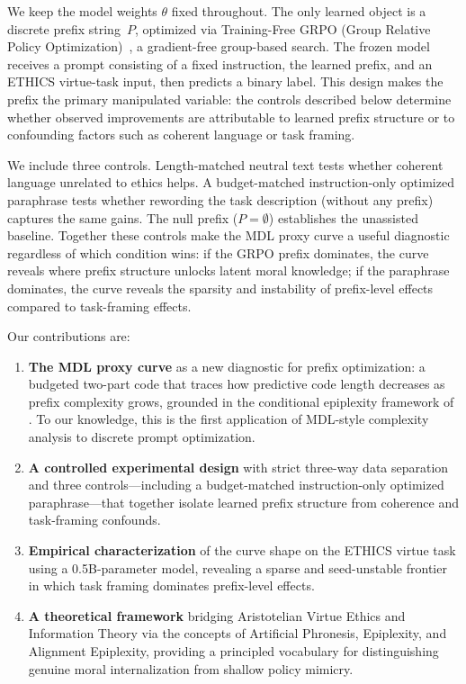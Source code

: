 \documentclass[preprint]{article}
\begin{document}
We keep the model weights $\theta$ fixed throughout.
The only learned object is a discrete prefix string~$P$, optimized via Training-Free GRPO (Group Relative Policy Optimization)~\citep{shao2024deepseekmath}, a gradient-free group-based search.
The frozen model receives a prompt consisting of a fixed instruction, the learned prefix, and an ETHICS virtue-task input, then predicts a binary label.
This design makes the prefix the primary manipulated variable: the controls described below determine whether observed improvements are attributable to learned prefix structure or to confounding factors such as coherent language or task framing.

We include three controls.
Length-matched neutral text tests whether coherent language unrelated to ethics helps.
A budget-matched instruction-only optimized paraphrase tests whether rewording the task description (without any prefix) captures the same gains.
The null prefix ($P = \emptyset$) establishes the unassisted baseline.
Together these controls make the MDL proxy curve a useful diagnostic regardless of which condition wins: if the GRPO prefix dominates, the curve reveals where prefix structure unlocks latent moral knowledge; if the paraphrase dominates, the curve reveals the sparsity and instability of prefix-level effects compared to task-framing effects.

Our contributions are:
\begin{enumerate}
    \item \textbf{The MDL proxy curve} as a new diagnostic for prefix optimization: a budgeted two-part code that traces how predictive code length decreases as prefix complexity grows, grounded in the conditional epiplexity framework of \citet{finzi2026epiplexity}. To our knowledge, this is the first application of MDL-style complexity analysis to discrete prompt optimization.
    \item \textbf{A controlled experimental design} with strict three-way data separation and three controls---including a budget-matched instruction-only optimized paraphrase---that together isolate learned prefix structure from coherence and task-framing confounds.
    \item \textbf{Empirical characterization} of the curve shape on the ETHICS virtue task using a 0.5B-parameter model, revealing a sparse and seed-unstable frontier in which task framing dominates prefix-level effects.
    \item \textbf{A theoretical framework} bridging Aristotelian Virtue Ethics and Information Theory via the concepts of Artificial Phronesis, Epiplexity, and Alignment Epiplexity, providing a principled vocabulary for distinguishing genuine moral internalization from shallow policy mimicry.
\end{enumerate}
\end{document}
